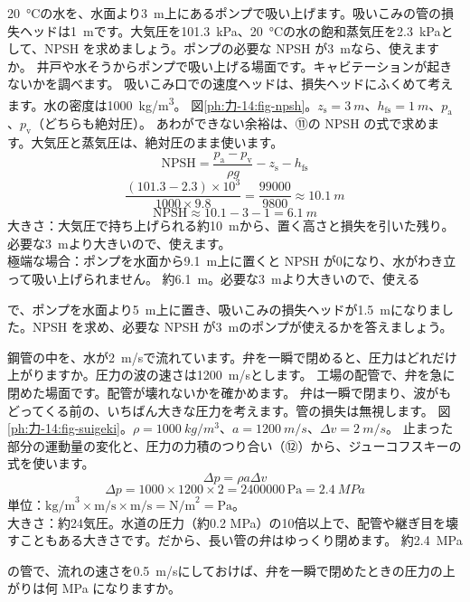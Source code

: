 \begin{phreidai}\label{ph:力-14:ex9}
\qty{20}{\celsius}の水を、水面より\qty{3}{m}上にあるポンプで吸い上げます。吸いこみの管の損失ヘッドは\qty{1}{m}です。大気圧を\qty{101.3}{kPa}、\qty{20}{\celsius}の水の飽和蒸気圧を\qty{2.3}{kPa}として、NPSH を求めましょう。ポンプの必要な NPSH が\qty{3}{m}なら、使えますか。
\phbamen
井戸や水そうからポンプで吸い上げる場面です。キャビテーションが起きないかを調べます。
\phmushi
吸いこみ口での速度ヘッドは、損失ヘッドにふくめて考えます。水の密度は\qty{1000}{kg/m^3}。
\phzu
図\ref{ph:力-14:fig-npsh}。$z_{\mathrm s}=\qty{3}{m}$、$h_{\mathrm{fs}}=\qty{1}{m}$、$p_{\mathrm a}$、$p_{\mathrm v}$（どちらも絶対圧）。
\phriyu
あわができない余裕は、⑪の NPSH の式で求めます。大気圧と蒸気圧は、絶対圧のまま使います。
\phtateru
\[\text{NPSH}=\frac{p_{\mathrm a}-p_{\mathrm v}}{\rho g}-z_{\mathrm s}-h_{\mathrm{fs}}\]
\phtoku
\[\frac{(101.3-2.3)\times10^3}{1000\times9.8}=\frac{\num{99000}}{9800}\approx\qty{10.1}{m}\]
\[\text{NPSH}\approx10.1-3-1=\qty{6.1}{m}\]
\phtashikame
大きさ：大気圧で持ち上げられる約\qty{10}{m}から、置く高さと損失を引いた残り。必要な\qty{3}{m}より大きいので、使えます。\\
極端な場合：ポンプを水面から\qty{9.1}{m}上に置くと NPSH が0になり、水がわき立って吸い上げられません。
\kotae 約\qty{6.1}{m}。必要な\qty{3}{m}より大きいので、使える
\end{phreidai}
\begin{jibun}
で、ポンプを水面より\qty{5}{m}上に置き、吸いこみの損失ヘッドが\qty{1.5}{m}になりました。NPSH を求め、必要な NPSH が\qty{3}{m}のポンプが使えるかを答えましょう。
\end{jibun}

\begin{phreidai}[弁を急に閉めたときの圧力]\label{ph:力-14:ex10}
鋼管の中を、水が\qty{2}{m/s}で流れています。弁を一瞬で閉めると、圧力はどれだけ上がりますか。圧力の波の速さは\qty{1200}{m/s}とします。
\phbamen
工場の配管で、弁を急に閉めた場面です。配管が壊れないかを確かめます。
\phmushi
弁は一瞬で閉まり、波がもどってくる前の、いちばん大きな圧力を考えます。管の損失は無視します。
\phzu
図\ref{ph:力-14:fig-suigeki}。$\rho=\qty{1000}{kg/m^3}$、$a=\qty{1200}{m/s}$、$\Delta v=\qty{2}{m/s}$。
\phriyu
止まった部分の運動量の変化と、圧力の力積のつり合い（⑫）から、ジューコフスキーの式を使います。
\phtateru
\[\Delta p=\rho a\Delta v\]
\phtoku
\[\Delta p=1000\times1200\times2=\num{2400000}\,\text{Pa}=\qty{2.4}{MPa}\]
\phtashikame
単位：$\text{kg/m}^3\times\text{m/s}\times\text{m/s}=\text{N/m}^2=\text{Pa}$。\\
大きさ：約24気圧。水道の圧力（約0.2 MPa）の10倍以上で、配管や継ぎ目を壊すこともある大きさです。だから、長い管の弁はゆっくり閉めます。
\kotae 約\qty{2.4}{MPa}
\end{phreidai}
\begin{jibun}
の管で、流れの速さを\qty{0.5}{m/s}にしておけば、弁を一瞬で閉めたときの圧力の上がりは何 MPa になりますか。
\end{jibun}

